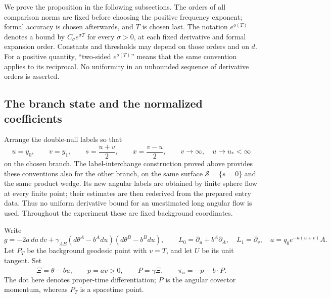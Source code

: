 We prove the proposition in the following subsections. The orders of
all comparison norms are fixed before choosing the positive frequency
exponent; formal accuracy is chosen afterwards, and $T$ is chosen last.
The notation $e^{o(T)}$ denotes a bound by $C_\sigma e^{\sigma T}$ for
every $\sigma>0$, at each fixed derivative and formal expansion order.
Constants and thresholds may depend on those orders and on $d$.
For a positive quantity, ``two-sided $e^{o(T)}$'' means that the same
convention applies to its reciprocal. No uniformity in an unbounded
sequence of derivative orders is asserted.

\subsection{The branch state and the normalized coefficients}
\label{pk2:branch}

Arrange the double-null labels so that
\[
 u=y_0,\qquad v=y_1,\qquad
 s=\frac{u+v}{2},\qquad x=\frac{v-u}{2},
 \qquad v\longrightarrow\infty,\quad u\longrightarrow u_*<\infty
\]
on the chosen branch. The label-interchange construction proved above
provides these conventions also for the other branch, on the same
surface $\mathcal S=\{s=0\}$ and the same product wedge. Its new angular
labels are obtained by finite sphere flow at every finite point; their
estimates are then rederived from the prepared entry data. Thus no
uniform derivative bound for an unestimated long angular flow is used.
Throughout the experiment these are fixed background coordinates.

Write
\[
 g=-2a\,du\,dv+
 \gamma_{AB}(d\theta^A-b^Adu)(d\theta^B-b^Bdu),
 \qquad L_0=\partial_u+b^A\partial_A,
 \quad L_1=\partial_v,
 \quad a=q_0e^{-\kappa(u+v)}A.
\]
Let $P_T$ be the background geodesic point with $v=T$, and let $U$ be
its unit tangent. Set
\[
 \Xi=\dot\theta-b\dot u,\qquad p=a\dot v>0,
 \qquad P=\gamma\Xi,\qquad \pi_u=-p-b\cdot P.
\]
The dot here denotes proper-time differentiation; $P$ is the angular
covector momentum, whereas $P_T$ is a spacetime point.

